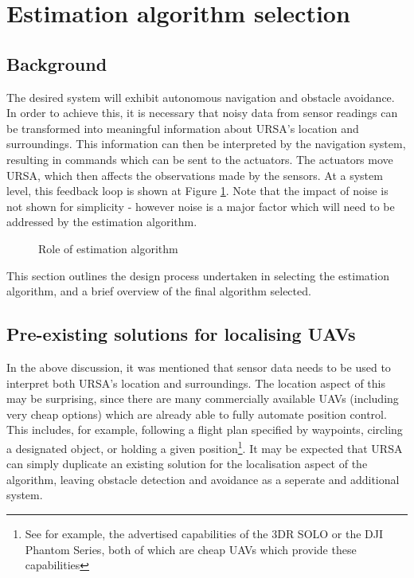\documentclass[capstone_report.tex]{subfiles}
\begin{document}
\section{Estimation algorithm selection}
\subsection{Background}
The desired system will exhibit autonomous navigation and obstacle avoidance. In order to achieve this, it is necessary that noisy data from sensor readings can be transformed into meaningful information about URSA's location and surroundings. This information can then be interpreted by the navigation system, resulting in commands which can be sent to the actuators. The actuators move URSA, which then affects the observations made by the sensors. At a system level, this feedback loop is shown at Figure \ref{fig:estAlg1}. Note that the impact of noise is not shown for simplicity - however noise is a major factor which will need to be addressed by the estimation algorithm.

\begin{figure}[H]
	
	\caption{Role of estimation algorithm\label{fig:estAlg1}}
\end{figure}

This section outlines the design process undertaken in selecting the estimation algorithm, and a brief overview of the final algorithm selected. 

\subsection{Pre-existing solutions for localising UAVs}
In the above discussion, it was mentioned that sensor data needs to be used to interpret both URSA's location and surroundings. The location aspect of this may be surprising, since there are many commercially available UAVs (including very cheap options) which are already able to fully automate position control. This includes, for example, following a flight plan specified by waypoints, circling a designated object, or holding a given position\footnote{See for example, the advertised capabilities of the 3DR SOLO or the DJI Phantom Series, both of which are cheap UAVs which provide these capabilities}. It may be expected that URSA can simply duplicate an existing solution for the localisation aspect of the algorithm, leaving obstacle detection and avoidance as a seperate and additional system.\\
\end{document}
